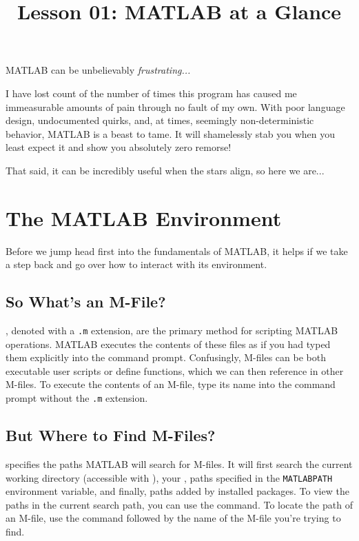 \documentclass{article}
\title{Lesson 01: MATLAB at a Glance}
\begin{document}
\renderTitle

MATLAB can be unbelievably \emph{frustrating...}

I have lost count of the number of times this program has caused me
immeasurable amounts of pain through no fault of my own. With poor
language design, undocumented quirks, and, at times, seemingly
non-deterministic behavior, MATLAB is a beast to tame.  It will
shamelessly stab you when you least expect it and show you absolutely
zero remorse!

That said, it can be incredibly useful when the stars align, so here we
are...

\section{The MATLAB Environment}

Before we jump head first into the fundamentals of MATLAB, it helps if
we take a step back and go over how to interact with its environment.

\subsection{So What’s an M-File?}

, denoted with a \texttt{.m} extension, are the primary
method for scripting MATLAB operations.  MATLAB executes the contents of
these files as if you had typed them explicitly into the command prompt.
Confusingly, M-files can be both executable user scripts or define
functions, which we can then reference in other M-files.  To execute the
contents of an M-file, type its name into the command prompt without the
\texttt{.m} extension.

\subsection{But Where to Find M-Files?}

 specifies the
paths MATLAB will search for M-files.  It will first search the current
working directory (accessible with ), your , paths specified in the
\texttt{MATLABPATH} environment variable, and finally, paths added by
installed packages.  To view the paths in the current search path, you
can use the  command.  To locate the path of an M-file, use the
command followed by the name of the M-file you're trying to find.
\end{document}
